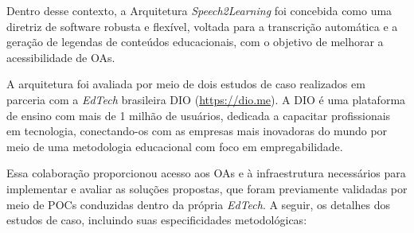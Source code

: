 Dentro desse contexto, a Arquitetura \textit{Speech2Learning} foi concebida como uma diretriz de software robusta e flexível, voltada para a transcrição automática e a geração de legendas de conteúdos educacionais, com o objetivo de melhorar a acessibilidade de OAs. 

A arquitetura foi avaliada por meio de dois estudos de caso realizados em parceria com a \textit{EdTech} brasileira DIO (\url{https://dio.me}). A DIO é uma plataforma de ensino com mais de 1 milhão de usuários, dedicada a capacitar profissionais em tecnologia, conectando-os com as empresas mais inovadoras do mundo por meio de uma metodologia educacional com foco em empregabilidade. 

Essa colaboração proporcionou acesso aos OAs e à infraestrutura necessários para implementar e avaliar as soluções propostas, que foram previamente validadas por meio de POCs conduzidas dentro da própria \textit{EdTech}. A seguir, os detalhes dos estudos de caso, incluindo suas especificidades metodológicas:

